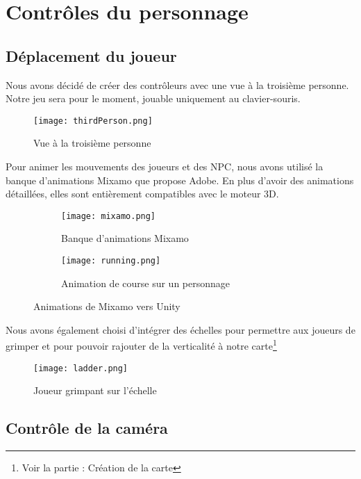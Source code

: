 \documentclass[../doc.tex]{subfiles}
\begin{document}
    \section{Contrôles du personnage}
        \subsection{Déplacement du joueur}
            Nous avons décidé de créer des contrôleurs avec une vue à la troisième personne.
            Notre jeu sera pour le moment, jouable uniquement au clavier-souris.
            \begin{figure}[hbt!]
                \centering
                \texttt{[image: thirdPerson.png]}
                \caption{Vue à la troisième personne}
            \end{figure}
            Pour animer les mouvements des joueurs et des NPC, nous avons utilisé la banque d'animations Mixamo que propose Adobe.
            En plus d'avoir des animations détaillées, elles sont entièrement compatibles avec le moteur 3D.
            \begin{figure}[hbt!]
                \centering
                \begin{subfigure}[b]{0.3\textwidth}
                    \texttt{[image: mixamo.png]} 
                    \caption{Banque d'animations Mixamo}
                \end{subfigure}
                \hspace{150pt}
                \begin{subfigure}[b]{0.3\textwidth}
                    \texttt{[image: running.png]} 
                    \caption{Animation de course sur un personnage}
                \end{subfigure}
                \caption{Animations de Mixamo vers Unity}
            \end{figure}

            Nous avons également choisi d'intégrer des échelles pour permettre aux joueurs de grimper et pour pouvoir rajouter de la verticalité à notre carte\footnote{Voir la partie : Création de la carte}
            \begin{figure}[hbt!]
                \centering
                \texttt{[image: ladder.png]}
                \caption{Joueur grimpant sur l'échelle}
            \end{figure}
        \subsection{Contrôle de la caméra}
\end{document}
